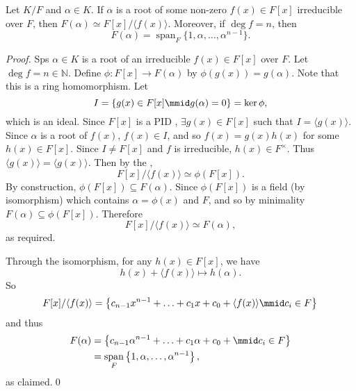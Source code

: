 \documentclass[notoc,notitlepage]{tufte-book}
\DeclareMathOperator{\Span}{span}
\begin{document}
\begin{propo}\label{propo:span_of_the_extension}
  Let $K / F$ and $\alpha \in K$. If $\alpha$ is a root of some non-zero $f(x) \in F[x]$ irreducible
  over $F$, then $F(\alpha) \simeq F[x] / \langle f(x) \rangle$. Moreover, if $\deg f = n$, then
  \begin{equation*}
    F(\alpha) = \Span_F \{ 1, \alpha, \ldots, \alpha^{n - 1} \}.
  \end{equation*}
\end{propo}

\begin{proof}
  Sps $\alpha \in K$ is a root of an irreducible $f(x) \in F[x]$ over $F$. Let $\deg f = n \in \mathbb{N}$.
  Define $\phi : F[x] \to F(\alpha)$ by $\phi(g(x)) = g(\alpha)$. Note that this is a ring homomorphism.
  Let
  \begin{equation*}
    I = \{ g(x) \in F[x] \mmid g(\alpha) = 0 \} = \ker \phi,
  \end{equation*}
  which is an ideal. Since $F[x]$ is a PID , $\exists g(x) \in F[x]$ such that
  $I = \langle g(x) \rangle$. Since $\alpha$ is a root of $f(x)$, $f(x) \in I$, and so $f(x) = g(x) h(x)$
  for some $h(x) \in F[x]$. Since $I \neq F[x]$ and $f$ is irreducible, $h(x) \in F^\times$. Thus
  $\langle g(x) \rangle = \langle g(x) \rangle$. Then by the ,
  \begin{equation*}
    F[x] / \langle f(x) \rangle \simeq \phi(F[x]).
  \end{equation*}
  By construction, $\phi(F[x]) \subseteq F(\alpha)$. Since $\phi(F[x])$ is a field (by isomorphism)
  which contains $\alpha = \phi(x)$ and $F$, and so by minimality $F(\alpha) \subseteq \phi(F[x])$.
  Therefore
  \begin{equation*}
    F[x]/ \langle f(x) \rangle \simeq F(\alpha),
  \end{equation*}
  as required.

  Through the isomorphism, for any $h(x) \in F[x]$, we have
  \begin{equation*}
    h(x) + \langle f(x) \rangle \mapsto h(\alpha).
  \end{equation*}
  So
  \begin{equation*}
    F[x] / \langle f(x) \rangle 
      = \left\{ c_{n - 1} x^{n - 1} + \hdots + c_1 x + c_0 + \langle f(x) \rangle \mmid c_i \in F \right\} \\
  \end{equation*}
  and thus
  \begin{align*}
    F(\alpha)
      &= \left\{ c_{n - 1} \alpha^{n - 1} + \hdots + c_1 \alpha + c_0 + \mmid c_i \in F \right\} \\
      &= \Span_F \left\{ 1, \alpha, \ldots, \alpha^{n - 1} \right\},
  \end{align*}
  as claimed.\qed\
\end{proof}
\end{document}
